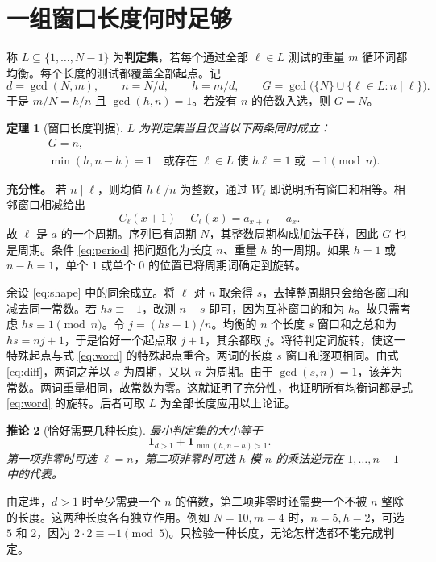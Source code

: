 \documentclass[UTF8,12pt,a4paper,fontset=fandol]{ctexart}
\theoremstyle{plaincn}
\newtheorem{theorem}{定理}
\newtheorem{corollary}[theorem]{推论}
\newcommand{\nextsec}[1]{\clearpage\section{#1}}
\begin{document}
\nextsec{一组窗口长度何时足够}
称 $L\subseteq\{1,\ldots,N-1\}$ 为\textbf{判定集}，若每个通过全部 $\ell\in L$ 测试的重量 $m$ 循环词都均衡。每个长度的测试都覆盖全部起点。记
\[
 d=\gcd(N,m),\qquad n=N/d,\qquad h=m/d,\qquad
 G=\gcd\bigl(\{N\}\cup\{\ell\in L:n\mid\ell\}\bigr).
\]
于是 $m/N=h/n$ 且 $\gcd(h,n)=1$。若没有 $n$ 的倍数入选，则 $G=N$。

\begin{theorem}[窗口长度判据]\label{thm:main}
$L$ 为判定集当且仅当以下两条同时成立：
\begin{align}
 &G=n, \label{eq:period}\\
 &\min(h,n-h)=1\quad\text{或存在 }\ell\in L\text{ 使 }h\ell\equiv 1
       \text{ 或 }-1\pmod n . \label{eq:shape}
\end{align}
\end{theorem}

\noindent\textbf{充分性。}
若 $n\mid\ell$，则均值 $h\ell/n$ 为整数，通过 $W_\ell$ 即说明所有窗口和相等。相邻窗口相减给出
\begin{equation}
 C_\ell(x+1)-C_\ell(x)=a_{x+\ell}-a_x .                 \label{eq:diff}
\end{equation}
故 $\ell$ 是 $a$ 的一个周期。序列已有周期 $N$，其整数周期构成加法子群，因此 $G$ 也是周期。条件 \eqref{eq:period} 把问题化为长度 $n$、重量 $h$ 的一周期。如果 $h=1$ 或 $n-h=1$，单个 $1$ 或单个 $0$ 的位置已将周期词确定到旋转。

余设 \eqref{eq:shape} 中的同余成立。将 $\ell$ 对 $n$ 取余得 $s$，去掉整周期只会给各窗口和减去同一常数。若 $hs\equiv-1$，改测 $n-s$ 即可，因为互补窗口的和为 $h$。故只需考虑 $hs\equiv1\pmod n$。令 $j=(hs-1)/n$。均衡的 $n$ 个长度 $s$ 窗口和之总和为 $hs=nj+1$，于是恰好一个起点取 $j+1$，其余都取 $j$。将待判定词旋转，使这一特殊起点与式 \eqref{eq:word} 的特殊起点重合。两词的长度 $s$ 窗口和逐项相同。由式 \eqref{eq:diff}，两词之差以 $s$ 为周期，又以 $n$ 为周期。由于 $\gcd(s,n)=1$，该差为常数。两词重量相同，故常数为零。这就证明了充分性，也证明所有均衡词都是式 \eqref{eq:word} 的旋转。后者可取 $L$ 为全部长度应用以上论证。

\begin{corollary}[恰好需要几种长度]\label{cor:number}
最小判定集的大小等于
\[
 \boldsymbol{1}_{d>1}+\boldsymbol{1}_{\min(h,n-h)>1}.
\]
第一项非零时可选 $\ell=n$，第二项非零时可选 $h$ 模 $n$ 的乘法逆元在 $1,\ldots,n-1$ 中的代表。
\end{corollary}
\noindent 由定理，$d>1$ 时至少需要一个 $n$ 的倍数，第二项非零时还需要一个不被 $n$ 整除的长度。这两种长度各有独立作用。例如 $N=10,m=4$ 时，$n=5,h=2$，可选 $5$ 和 $2$，因为 $2\cdot2\equiv-1\pmod5$。只检验一种长度，无论怎样选都不能完成判定。
\end{document}
